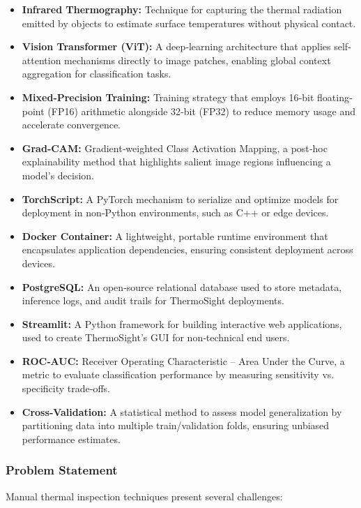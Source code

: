 \begin{itemize}
    \item \textbf{Infrared Thermography:} Technique for capturing the thermal radiation emitted by objects to estimate surface temperatures without physical contact.
    \item \textbf{Vision Transformer (ViT):} A deep‐learning architecture that applies self‐attention mechanisms directly to image patches, enabling global context aggregation for classification tasks.
    \item \textbf{Mixed‐Precision Training:} Training strategy that employs 16‐bit floating‐point (FP16) arithmetic alongside 32‐bit (FP32) to reduce memory usage and accelerate convergence.
    \item \textbf{Grad‐CAM:} Gradient‐weighted Class Activation Mapping, a post‐hoc explainability method that highlights salient image regions influencing a model’s decision.
    \item \textbf{TorchScript:} A PyTorch mechanism to serialize and optimize models for deployment in non‐Python environments, such as C++ or edge devices.
    \item \textbf{Docker Container:} A lightweight, portable runtime environment that encapsulates application dependencies, ensuring consistent deployment across devices.
    \item \textbf{PostgreSQL:} An open‐source relational database used to store metadata, inference logs, and audit trails for ThermoSight deployments.
    \item \textbf{Streamlit:} A Python framework for building interactive web applications, used to create ThermoSight’s GUI for non‐technical end users.
    \item \textbf{ROC‐AUC:} Receiver Operating Characteristic – Area Under the Curve, a metric to evaluate classification performance by measuring sensitivity vs. specificity trade‐offs.
    \item \textbf{Cross‐Validation:} A statistical method to assess model generalization by partitioning data into multiple train/validation folds, ensuring unbiased performance estimates.
\end{itemize}

\subsubsection*{Problem Statement}
Manual thermal inspection techniques present several challenges:

